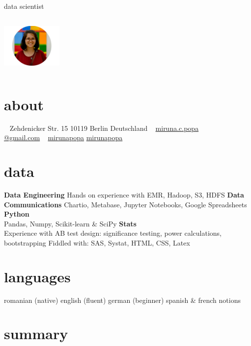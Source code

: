 \documentclass[]{friggeri-cv}
\begin{document}
       {data scientist}

\begin{aside}
  \includegraphics[width = 3cm, height = 3cm, keepaspectratio=true]{reedited_photo.png}
  ~
  \section{about}
  ~
    Zehdenicker Str. 15
    10119 Berlin
    Deutschland
    ~
    {\color{lightgray} \faEnvelope \href{mailto:miruna.c.popa@gmail.com} {  miruna.c.popa\\@gmail.com}}
    {\color{lightgray} }
    ~
    {\color{lightgray} \faGithub \href{https://www.github.com/mirunapopa} {  mirunapopa}}
    {\color{lightgray} \faLinkedin \href{https://www.linkedin.com/in/mirunapopa}{   mirunapopa}}
    ~

  \section{data}
    {\color{red}  }
    {\textbf{Data Engineering} {Hands on experience with EMR, Hadoop, S3, HDFS}}
    {\textbf{Data Communications} {Chartio, Metabase, Jupyter Notebooks, Google Spreadsheets}}
    {\textbf{Python}\\ {Pandas, Numpy, Scikit-learn \& SciPy}}
    {\textbf{Stats} \\{Experience with AB test design: significance testing, power calculations, bootstrapping}}
    {Fiddled with: SAS, Systat, HTML, CSS, Latex}
  ~

  \section{languages}
    romanian (native)
    english (fluent)
    german (beginner)
    spanish \& french notions
\end{aside}

\section{summary}
\end{document}
